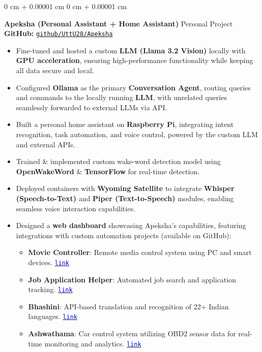 \documentclass[10pt, letterpaper]{article}
\newenvironment{highlights}{
    \begin{itemize}[
        topsep=0.10 cm,
        parsep=0.10 cm,
        partopsep=0pt,
        itemsep=0pt,
        leftmargin=0 cm + 10pt
    ]
}{
    \end{itemize}
} %
\newenvironment{onecolentry}{
    \begin{adjustwidth}{
        0 cm + 0.00001 cm
    }{
        0 cm + 0.00001 cm
    }
}{
    \end{adjustwidth}
} %
\begin{document}
\begin{onecolentry}
    \textbf{Apeksha (Personal Assistant + Home Assistant)} \hfill Personal Project \\
    \textbf{GitHub:} \href{https://github.com/UttU28/Apeksha}{\texttt{github/UttU28/Apeksha}}
    \begin{highlights}
        \item Fine-tuned and hosted a custom \textbf{LLM (Llama 3.2 Vision)} locally with \textbf{GPU acceleration}, ensuring high-performance functionality while keeping all data secure and local.
        \item Configured \textbf{Ollama} as the primary \textbf{Conversation Agent}, routing queries and commands to the locally running \textbf{LLM}, with unrelated queries seamlessly forwarded to external LLMs via API.
        \item Built a personal home assistant on \textbf{Raspberry Pi}, integrating intent recognition, task automation, and voice control, powered by the custom LLM and external APIs.
        \item Trained \& implemented custom wake-word detection model using \textbf{OpenWakeWord} \& \textbf{TensorFlow} for real-time detection.
        \item Deployed containers with \textbf{Wyoming Satellite} to integrate \textbf{Whisper (Speech-to-Text)} and \textbf{Piper (Text-to-Speech)} modules, enabling seamless voice interaction capabilities.
        \item Designed a \textbf{web dashboard} showcasing Apeksha's capabilities, featuring integrations with custom automation projects (available on GitHub):
        \begin{highlights}
            \item \textbf{Movie Controller}: Remote media control system using PC and smart devices. \href{https://github.com/UttU28/Movie_Controller_2}{\textcolor{blue}{\texttt{link}}}
            \item \textbf{Job Application Helper}: Automated job search and application tracking. \href{https://github.com/UttU28/Job-Application-Helper}{\textcolor{blue}{\texttt{link}}}
            \item \textbf{Bhashini}: API-based translation and recognition of 22+ Indian languages. \href{https://github.com/UttU28/Apeksha_Frontend/}{\textcolor{blue}{\texttt{link}}}
            \item \textbf{Ashwathama}: Car control system utilizing OBD2 sensor data for real-time monitoring and analytics. \href{https://github.com/UttU28/Apeksha_Frontend/}{\textcolor{blue}{\texttt{link}}}
        \end{highlights}
        

\end{highlights}
\end{onecolentry}
\end{document}
